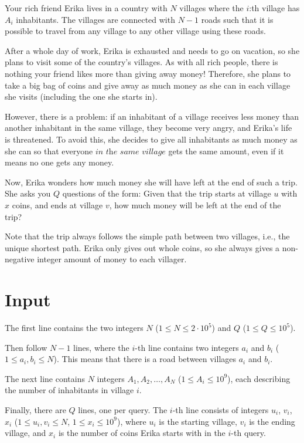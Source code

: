 Your rich friend Erika lives in a country with $N$ villages where the $i$:th village has $A_i$ inhabitants.
The villages are connected with $N-1$ roads such that it is possible to travel from any village to any other
village using these roads.

After a whole day of work, Erika is exhausted and needs to go on vacation, so she plans to visit some of
the country's villages. As with all rich people, there is nothing your friend likes more than giving away money!
Therefore, she plans to take a big bag of coins and give away as much money as she can in each village
she visits (including the one she starts in).

However, there is a problem: if an inhabitant of a village receives less money than another inhabitant in
the same village, they become very angry, and Erika's life is threatened. To avoid this, she decides to
give all inhabitants as much money as she can so that everyone $\textit{in the same village}$ gets the
same amount, even if it means no one gets any money.

Now, Erika wonders how much money she will have left at the end of such a trip. She asks you $Q$ questions
of the form: Given that the trip starts at village $u$ with $x$ coins, and ends at village $v$, how much
money will be left at the end of the trip?

Note that the trip always follows the simple path between two villages, i.e., the unique shortest path.
Erika only gives out whole coins, so she always gives a non-negative integer amount of money to each villager.

\section*{Input}
The first line contains the two integers $N$ ($1 \leq N \leq 2 \cdot 10^5$) and $Q$ ($1 \leq Q \leq 10^5$).

Then follow $N-1$ lines, where the $i$-th line contains two integers $a_i$ and $b_i$ ($1 \leq a_i, b_i \leq N$).
This means that there is a road between villages $a_i$ and $b_i$.

The next line contains $N$ integers $A_1, A_2, \dots, A_N$ ($1 \leq A_i \leq 10^9$), each describing the number
of inhabitants in village $i$.

Finally, there are $Q$ lines, one per query.
The $i$-th line consists of integers $u_i$, $v_i$, $x_i$ ($1 \leq u_i, v_i \leq N$, $1 \leq x_i \leq 10^9$),
where $u_i$ is the starting village, $v_i$ is the ending village, and $x_i$ is the number of coins Erika
starts with in the $i$-th query.

